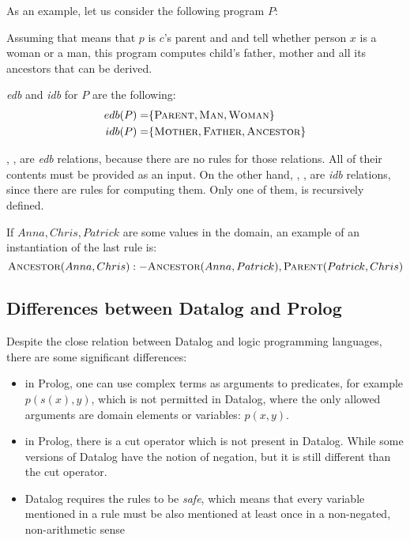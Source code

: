 \begin{exmp}
As an example, let us consider the following program $P$:


Assuming that  means that $p$ is $c$'s parent and  and  tell whether person $x$ is a woman or a man, this program computes child's father, mother and all its ancestors that can be derived.

\emph{edb} and \emph{idb} for $P$ are the following:
\begin{align*}
edb(P) =& \{\textsc{Parent}, \textsc{Man}, \textsc{Woman}\} \\
idb(P) =& \{\textsc{Mother}, \textsc{Father}, \textsc{Ancestor}\}
\end{align*}

, ,  are \emph{edb} relations, because there are no rules for those relations. All of their contents must be provided as an input. On the other hand, , ,  are \emph{idb} relations, since there are rules for computing them. Only one of them,  is recursively defined.

If $Anna, Chris, Patrick$ are some values in the domain, an example of an instantiation of the last rule is:
$$\textsc{Ancestor}(Anna, Chris) :- \textsc{Ancestor} (Anna, Patrick), \textsc{Parent} (Patrick, Chris)$$
\end{exmp}

\subsection{Differences between Datalog and Prolog}
Despite the close relation between Datalog and logic programming languages, there are some significant differences:
\begin{itemize}
\item in Prolog, one can use complex terms as arguments to predicates, for example $p(s(x), y)$, which is not permitted in Datalog, where the only allowed arguments are domain elements or variables: $p(x, y)$.
\item in Prolog, there is a cut operator which is not present in Datalog. While some versions of Datalog have the notion of negation, but it is still different than the cut operator.
\item Datalog requires the rules to be \emph{safe}, which means that every variable mentioned in a rule must be also mentioned at least once in a non-negated, non-arithmetic sense
\end{itemize}


